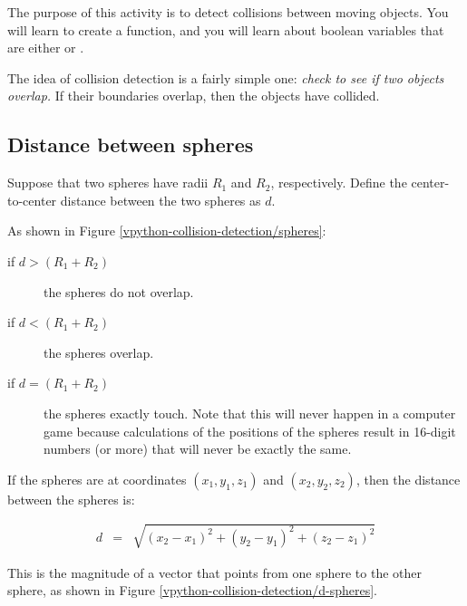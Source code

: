 
\apparatus
{}

\longgoal

The purpose of this activity is to detect collisions between moving objects. You will learn to create a function, and you will learn about boolean variables that are either  or .

\introduction

The idea of collision detection is a fairly simple one: \emph{check to see if two objects overlap.} If their boundaries overlap, then the objects have collided.

\subsection*{Distance between spheres}

Suppose that two spheres have radii $R_1$ and $R_2$, respectively. Define the center-to-center distance between the two spheres as $d$. 



As shown in Figure \ref{vpython-collision-detection/spheres}:

\begin{description}
	\item[if $d>(R_1+R_2)$] the spheres do not overlap.
	\item[if $d<(R_1+R_2)$] the spheres overlap.
	\item[if $d=(R_1+R_2)$] the spheres exactly touch. Note that this will never happen in a computer game because calculations of the positions of the spheres result in 16-digit numbers (or more) that will never be exactly the same.
\end{description}


If the spheres are at coordinates $(x_1, y_1, z_1)$ and $(x_2, y_2, z_2)$, then the distance between the spheres is:

\begin{eqnarray*}
	d & = & \sqrt{(x_2-x_1)^2 + (y_2-y_1)^2 + (z_2-z_1)^2}
\end{eqnarray*}

This is the magnitude of a vector that points from one sphere to the other sphere, as shown in Figure \ref{vpython-collision-detection/d-spheres}. 


